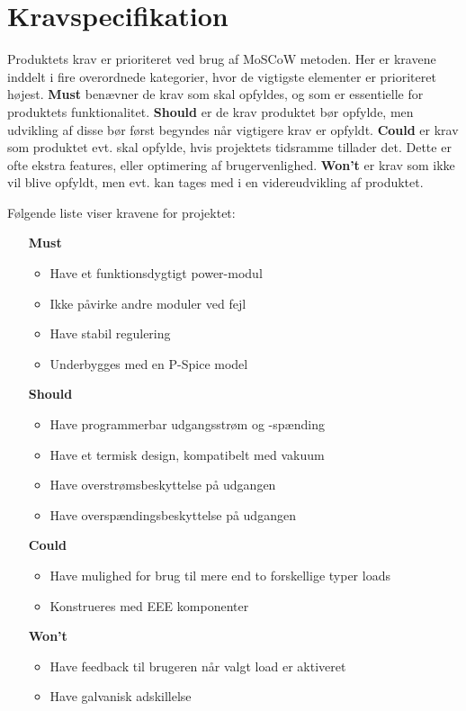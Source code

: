 \chapter{Kravspecifikation}

Produktets krav er prioriteret ved brug af MoSCoW metoden. Her er kravene inddelt i fire overordnede kategorier, hvor de vigtigste elementer er prioriteret højest. \textbf{Must} benævner de krav som skal opfyldes, og som er essentielle for produktets funktionalitet. \textbf{Should} er de krav produktet bør opfylde, men udvikling af disse bør først begyndes når vigtigere krav er opfyldt. \textbf{Could} er krav som produktet evt. skal opfylde, hvis projektets tidsramme tillader det. Dette er ofte ekstra features, eller optimering af brugervenlighed. \textbf{Won't} er krav som ikke vil blive opfyldt, men evt. kan tages med i en videreudvikling af produktet.

\noindent Følgende liste viser kravene for projektet:
\begin{itemize}
	\item[\textbf{Must}]
		\begin{itemize}
			\item Have et funktionsdygtigt power-modul
			\item Ikke påvirke andre moduler ved fejl
			\item Have stabil regulering
			\item Underbygges med en P-Spice model

		\end{itemize}
	\item[\textbf{Should}]
		\begin{itemize}
			\item Have programmerbar udgangsstrøm og -spænding
			\item Have et termisk design, kompatibelt med vakuum
			\item Have overstrømsbeskyttelse på udgangen
			\item Have overspændingsbeskyttelse på udgangen

		\end{itemize}
	\item[\textbf{Could}] 
		\begin{itemize}
			\item Have mulighed for brug til mere end to forskellige typer loads
			\item Konstrueres med EEE komponenter

		\end{itemize}
	\item[\textbf{Won't}]
		\begin{itemize}
			\item Have feedback til brugeren når valgt load er aktiveret
			\item Have galvanisk adskillelse
			
		\end{itemize}
\end{itemize}


